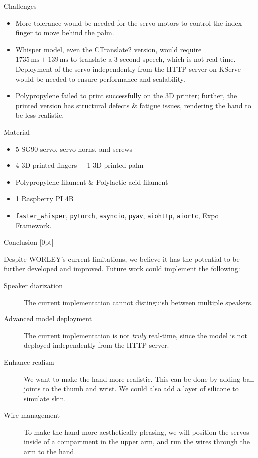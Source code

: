\documentclass[final, 16pt]{beamer}
\newlength{\colwidth}
\begin{document}
\begin{frame}[t]
\begin{columns}[t]
\begin{column}{\colwidth}
  \fontsize{22}{24}\selectfont
  \begin{block}{Challenges}
    \begin{itemize}
      \item More tolerance would be needed for the servo motors to control the index finger to move behind the palm.
      \item Whisper model, even the CTranslate2 version, would require $1735\,\text{ms}\pm 139\,\text{ms}$ to translate a 3-second speech, which is not real-time. Deployment of the servo independently from the HTTP server on KServe would be needed to ensure performance and scalability.
      \item Polypropylene failed to print successfully on the 3D printer; further, the printed version has structural defects \& fatigue issues, rendering the hand to be less realistic.
    \end{itemize}
  \end{block}

  \begin{block}{Material}
    \begin{itemize}
      \item 5 SG90 servo, servo horns, and screws
      \item 4 3D printed fingers + 1 3D printed palm
      \item Polypropylene filament \& Polylactic acid filament
      \item 1 Raspberry PI 4B
      \item \texttt{faster\_whisper}, \texttt{pytorch}, \texttt{asyncio}, \texttt{pyav}, \texttt{aiohttp}, \texttt{aiortc}, Expo Framework.
    \end{itemize}
  \end{block}
  \begin{block}{Conclusion}
    [0pt]

    Despite WORLEY's current limitations, we believe it has the potential to be further developed and improved. Future work could implement the following:
    
    \begin{description}
      \item[Speaker diarization] The current implementation cannot distinguish between multiple speakers.
      \item[Advanced model deployment] The current implementation is not \emph{truly} real-time, since the model is not deployed independently from the HTTP server.
      \item[Enhance realism] We want to make the hand more realistic. This can be done by adding ball joints to the thumb and wrist. We could also add a layer of silicone to simulate skin.
      \item[Wire management] To make the hand more aesthetically pleasing, we will position the servos inside of a compartment in the upper arm, and run the wires through the arm to the hand.
    \end{description}
    

\end{block}
\end{column}
\end{columns}
\end{frame}
\end{document}
